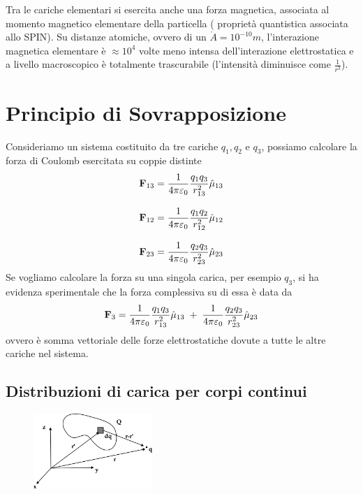 \begin{remark}
Tra le cariche elementari si esercita anche una forza magnetica, associata al momento magnetico elementare della particella ( propriet\`a quantistica associata allo SPIN). Su distanze atomiche, ovvero di un $\mathring{A} = 10^{-10} m$, l'interazione magnetica elementare \`e  $\approx 10^4$ volte meno intensa dell'interazione elettrostatica e a livello macroscopico \`e totalmente trascurabile (l'intensit\`a diminuisce come $\frac{1}{r^3}$).
\end{remark}

\section{Principio di Sovrapposizione}

Consideriamo un sistema costituito da tre cariche $q_1,q_2$ e $q_3$, possiamo calcolare la forza di Coulomb esercitata su coppie distinte 
\begin{equation*}
	\begin{aligned}
		& \bold{F}_{13} = \frac{1}{4\pi \varepsilon_0} \frac{q_1q_3}{r_{13}^2}\hat{\mu}_{13} \\[0.3cm]
		& \bold{F}_{12} = \frac{1}{4\pi \varepsilon_0} \frac{q_1q_2}{r_{12}^2}\hat{\mu}_{12} \\[0.3cm]
		& \bold{F}_{23} = \frac{1}{4\pi \varepsilon_0} \frac{q_2q_3}{r_{23}^2}\hat{\mu}_{23} \\
	\end{aligned}
\end{equation*}
Se vogliamo calcolare la forza su una singola carica, per esempio $q_3$, si ha evidenza sperimentale che la forza complessiva su di essa \`e data da 
\begin{equation*}
	\bold{F}_{3} = \frac{1}{4 \pi \varepsilon_0} \frac{q_1q_3}{r_{13}^2}\hat{\mu}_{13} \; + \; \frac{1}{4\pi \varepsilon_0} \frac{q_2q_3}{r_{23}^2}\hat{\mu}_{23}
\end{equation*}
ovvero \`e somma vettoriale delle forze elettrostatiche dovute a tutte le altre cariche nel sistema.


\subsection{Distribuzioni di carica per corpi continui}

\begin{figure}
  \begin{center}
    \includegraphics[width=0.4\textwidth]{images/chargeDist}
  \end{center}
\end{figure}

